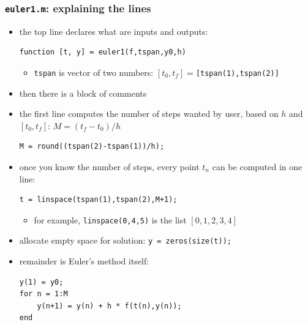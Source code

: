 \documentclass[urlcolor=blue,dvipsnames]{beamer}
\begin{document}
\begin{frame}[fragile]
\frametitle{\texttt{euler1.m}: explaining the lines}

\begin{itemize}
\item the top line declares what are inputs and outputs:

{\color{Green}
\begin{Verbatim}[fontsize=\small]
function [t, y] = euler1(f,tspan,y0,h)
\end{Verbatim}
}
    \begin{itemize}
    \item \texttt{tspan} is vector of two numbers: \footnotesize $[t_0,t_f]=$\texttt{[tspan(1),tspan(2)]}
    \end{itemize}
\item then there is a block of comments
\item the first line computes the number of steps wanted by user, based on $h$ and $[t_0,t_f]$:  \quad $M=(t_f-t_0)/h$

{\color{Green}
\begin{Verbatim}[fontsize=\small]
M = round((tspan(2)-tspan(1))/h);
\end{Verbatim}
}
\item once you know the number of steps, every point $t_n$ can be computed in one line:

{\color{Green}
\begin{Verbatim}[fontsize=\small]
t = linspace(tspan(1),tspan(2),M+1);
\end{Verbatim}
}
    \begin{itemize}
    \item for example, \texttt{linspace(0,4,5)} is the list $[0,1,2,3,4]$
    \end{itemize}

\item allocate empty space for solution: {\color{Green}\texttt{y = zeros(size(t));}}
\item \begin{minipage}[t]{0.3\textwidth}
remainder is Euler's method itself:
\end{minipage}
\quad
\begin{minipage}[t]{0.55\textwidth}
\vspace{-3mm}
{\color{Green}
\begin{Verbatim}[fontsize=\small]
y(1) = y0;
for n = 1:M
    y(n+1) = y(n) + h * f(t(n),y(n));
end
\end{Verbatim}
}
\end{minipage}
\end{itemize}

\end{frame}
\end{document}
